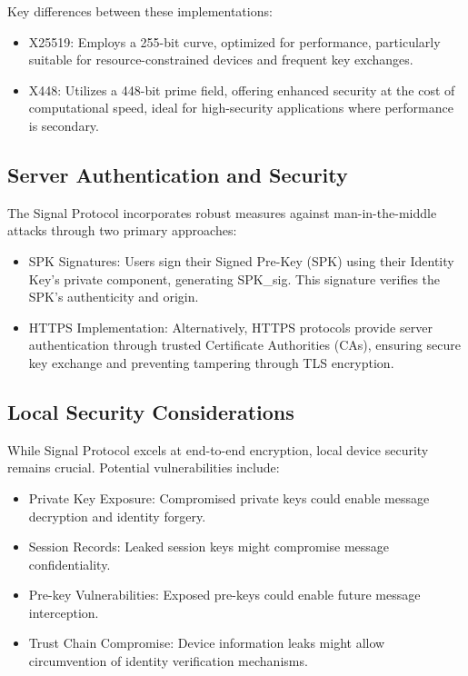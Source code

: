 \documentclass[9pt,a4paper,twoside]{rho-class/rho}
\begin{document}
Key differences between these implementations:
\begin{itemize}
    \item X25519: Employs a 255-bit curve, optimized for performance, particularly suitable for resource-constrained devices and frequent key exchanges.
    \item X448: Utilizes a 448-bit prime field, offering enhanced security at the cost of computational speed, ideal for high-security applications where performance is secondary.
\end{itemize}

\subsection{Server Authentication and Security}
The Signal Protocol incorporates robust measures against man-in-the-middle attacks through two primary approaches:
\begin{itemize}
    \item SPK Signatures: Users sign their Signed Pre-Key (SPK) using their Identity Key's private component, generating SPK\_sig. This signature verifies the SPK's authenticity and origin.
    \item HTTPS Implementation: Alternatively, HTTPS protocols provide server authentication through trusted Certificate Authorities (CAs), ensuring secure key exchange and preventing tampering through TLS encryption.
\end{itemize}

\subsection{Local Security Considerations}
While Signal Protocol excels at end-to-end encryption, local device security remains crucial. Potential vulnerabilities include:

\begin{itemize}
    \item Private Key Exposure: Compromised private keys could enable message decryption and identity forgery.
    \item Session Records: Leaked session keys might compromise message confidentiality.
    \item Pre-key Vulnerabilities: Exposed pre-keys could enable future message interception.
    \item Trust Chain Compromise: Device information leaks might allow circumvention of identity verification mechanisms.
\end{itemize}
\end{document}

